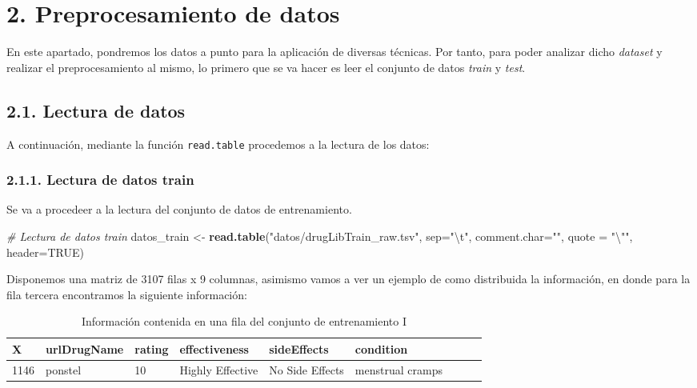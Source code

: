 \documentclass[spanish,]{article}
\newenvironment{Shaded}{\begin{snugshade}}{\end{snugshade}}
\newcommand{\KeywordTok}[1]{\textcolor[rgb]{0.13,0.29,0.53}{\textbf{#1}}}
\newcommand{\DataTypeTok}[1]{\textcolor[rgb]{0.13,0.29,0.53}{#1}}
\newcommand{\CharTok}[1]{\textcolor[rgb]{0.31,0.60,0.02}{#1}}
\newcommand{\StringTok}[1]{\textcolor[rgb]{0.31,0.60,0.02}{#1}}
\newcommand{\CommentTok}[1]{\textcolor[rgb]{0.56,0.35,0.01}{\textit{#1}}}
\newcommand{\OtherTok}[1]{\textcolor[rgb]{0.56,0.35,0.01}{#1}}
\newcommand{\NormalTok}[1]{#1}
\begin{document}
\section{2. Preprocesamiento de datos}\label{preprocesamiento-de-datos}

En este apartado, pondremos los datos a punto para la aplicación de
diversas técnicas. Por tanto, para poder analizar dicho \emph{dataset} y
realizar el preprocesamiento al mismo, lo primero que se va hacer es
leer el conjunto de datos \emph{train} y \emph{test}.

\subsection{2.1. Lectura de datos}\label{lectura-de-datos}

A continuación, mediante la función \texttt{read.table} procedemos a la
lectura de los datos:

\subsubsection{2.1.1. Lectura de datos
train}\label{lectura-de-datos-train}

Se va a procedeer a la lectura del conjunto de datos de entrenamiento.

\begin{Shaded}
\begin{Highlighting}[]
\CommentTok{# Lectura de datos train}
\NormalTok{datos_train <-}\StringTok{ }\KeywordTok{read.table}\NormalTok{(}\StringTok{"datos/drugLibTrain_raw.tsv"}\NormalTok{, }\DataTypeTok{sep=}\StringTok{"}\CharTok{\textbackslash{}t}\StringTok{"}\NormalTok{, }\DataTypeTok{comment.char=}\StringTok{""}\NormalTok{,}
                          \DataTypeTok{quote =} \StringTok{"}\CharTok{\textbackslash{}"}\StringTok{"}\NormalTok{, }\DataTypeTok{header=}\OtherTok{TRUE}\NormalTok{)}
\end{Highlighting}
\end{Shaded}

Disponemos una matriz de 3107 filas x 9 columnas, asimismo vamos a ver
un ejemplo de como distribuida la información, en donde para la fila
tercera encontramos la siguiente información:

\begin{table}[h]
  \centering
    \begin{tabular}{|l|l|l|l|l|l|l|l|l|}
      \hline
      \rowcolor[rgb]{0.94,0.97,1.0} \textbf{X} & \textbf{urlDrugName} & \textbf{rating} & \textbf{effectiveness} 
      & \textbf{sideEffects} &\textbf{condition} \\ \hline
      1146 & ponstel & 10 & Highly Effective & No Side Effects & menstrual cramps  \\ \hline
    \end{tabular}
  \caption{Información contenida en una fila del conjunto de entrenamiento I}
  \label{tabla:datos_trainI}
\end{table}
\end{document}
